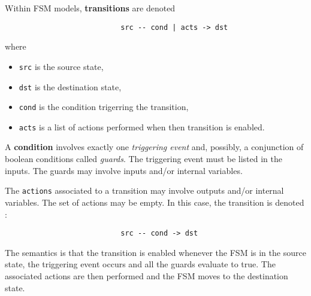 \medskip
\noindent
Within FSM models, \textbf{transitions} are denoted 

\begin{verbatim}
                           src -- cond | acts -> dst
\end{verbatim}

where
\begin{itemize}
\item \texttt{src} is the source state,
\item \texttt{dst} is the destination state,
\item \texttt{cond} is the condition trigerring the transition,
\item \texttt{acts} is a list of actions performed when then transition is enabled.
\end{itemize}

\medskip
A \textbf{condition} involves exactly one \emph{triggering event} and, possibly, a conjunction of boolean
conditions called \emph{guards}. The triggering event must be listed in the inputs. The guards may
involve inputs and/or internal variables.

\medskip
The \texttt{actions} associated to a transition may involve outputs and/or internal variables.
The set of actions may be empty. In this case, the transition is denoted :

\begin{verbatim}
                           src -- cond -> dst
\end{verbatim}


\medskip
The semantics is that the transition is enabled whenever
the FSM is in the source state, the triggering event occurs and all the guards evaluate to
true. The associated actions are then performed and the FSM moves to the destination state.

